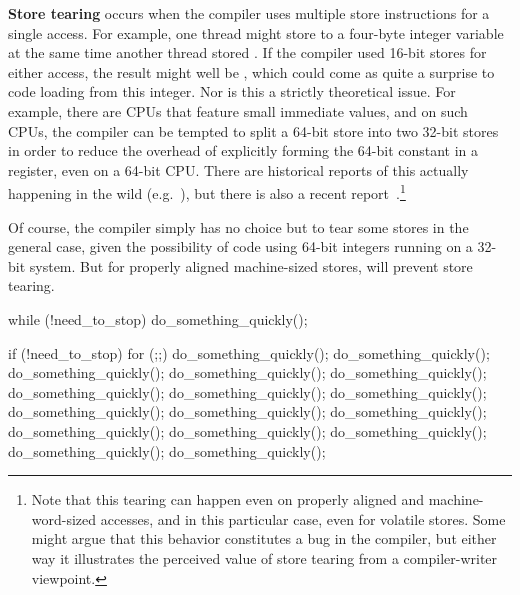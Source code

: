 {\bf Store tearing} occurs when the compiler uses multiple store
instructions for a single access.
For example, one thread might store  to a four-byte integer
variable at the same time another thread stored .
If the compiler used 16-bit stores for either access, the result
might well be , which could come as quite a surprise to
code loading from this integer.
Nor is this a strictly theoretical issue.
For example, there are CPUs that feature small immediate values,
and on such CPUs, the compiler can be tempted to split a 64-bit
store into two 32-bit stores in order to reduce the overhead
of explicitly forming the 64-bit constant in a register,
even on a 64-bit CPU.
There are historical reports of this actually happening in
the wild (e.g.~\cite{KonstantinKhlebnikov2013gccstoretearing}),
but there is also a recent
report~\cite{WillDeacon2019StoreTearingReport}.\footnote{
	Note that this tearing can happen even on properly aligned
        and machine-word-sized accesses, and in this particular case,
	even for volatile stores.
	Some might argue that this behavior constitutes a bug in the
	compiler, but either way it illustrates the perceived value of
	store tearing from a compiler-writer viewpoint.
}

Of course, the compiler simply has no choice but to tear some stores
in the general case, given
the possibility of code using 64-bit integers running on a 32-bit system.
But for properly aligned machine-sized stores,  will
prevent store tearing.

\begin{listing}[tbp]
\begin{fcvlabel}
\begin{VerbatimL}[commandchars=\\\{\}]
while (!need_to_stop)
	do_something_quickly();
\end{VerbatimL}
\end{fcvlabel}
\caption{Inviting Load Fusing}
\label{lst:toolsoftrade:Inviting Load Fusing}
\end{listing}

\begin{listing}[tbp]
\begin{fcvlabel}
\begin{VerbatimL}[commandchars=\\\[\]]
if (!need_to_stop)
	for (;;) {\lnlbl[loop:b]
		do_something_quickly();
		do_something_quickly();
		do_something_quickly();
		do_something_quickly();
		do_something_quickly();
		do_something_quickly();
		do_something_quickly();
		do_something_quickly();
		do_something_quickly();
		do_something_quickly();
		do_something_quickly();
		do_something_quickly();
		do_something_quickly();
		do_something_quickly();
		do_something_quickly();
		do_something_quickly();
	}\lnlbl[loop:e]
\end{VerbatimL}
\end{fcvlabel}
\caption{C Compilers Can Fuse Loads}
\label{lst:toolsoftrade:C Compilers Can Fuse Loads}
\end{listing}

